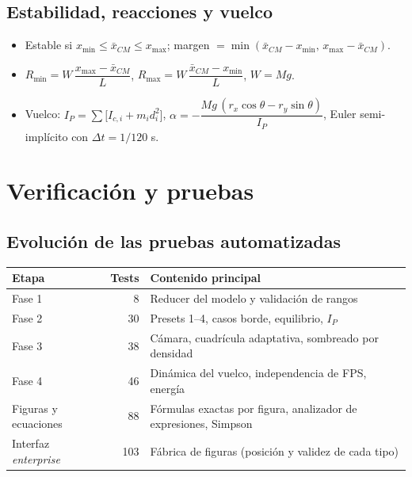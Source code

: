 \documentclass[11pt,a4paper]{article}
\begin{document}
\subsection{Estabilidad, reacciones y vuelco}
\begin{itemize}
  \item Estable si $x_{\min}\le \bar x_{CM}\le x_{\max}$; margen $=\min(\bar x_{CM}-x_{\min},\,x_{\max}-\bar x_{CM})$.
  \item $R_{\min}=W\,\dfrac{x_{\max}-\bar x_{CM}}{L}$, \quad $R_{\max}=W\,\dfrac{\bar x_{CM}-x_{\min}}{L}$, \quad $W=Mg$.
  \item Vuelco: $I_P=\sum\big[I_{c,i}+m_i d_i^2\big]$, \quad
        $\alpha=-\dfrac{Mg\,(r_x\cos\theta-r_y\sin\theta)}{I_P}$, Euler semi-implícito con $\Delta t=1/120$ s.
\end{itemize}

\section{Verificación y pruebas}

\subsection{Evolución de las pruebas automatizadas}
\begin{center}
\small
\begin{tabular}{lrl}
\toprule
\textbf{Etapa} & \textbf{Tests} & \textbf{Contenido principal}\\
\midrule
Fase 1 & 8 & Reducer del modelo y validación de rangos\\
Fase 2 & 30 & Presets 1–4, casos borde, equilibrio, $I_P$\\
Fase 3 & 38 & Cámara, cuadrícula adaptativa, sombreado por densidad\\
Fase 4 & 46 & Dinámica del vuelco, independencia de FPS, energía\\
Figuras y ecuaciones & 88 & Fórmulas exactas por figura, analizador de expresiones, Simpson\\
Interfaz \emph{enterprise} & 103 & Fábrica de figuras (posición y validez de cada tipo)\\
\bottomrule
\end{tabular}
\end{center}
\end{document}
